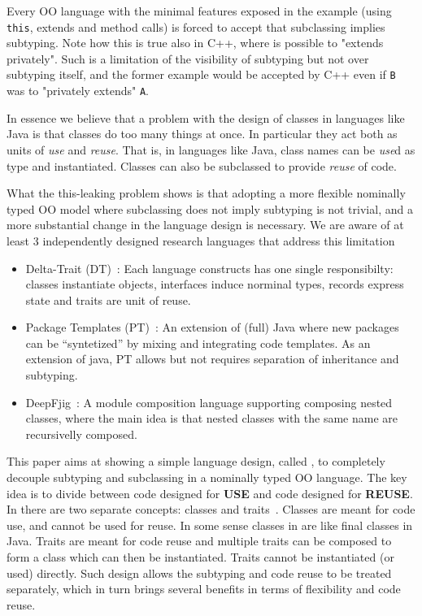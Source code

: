 Every OO language with the minimal features exposed in the example (using \lstinline{this},
extends and method calls) is forced to accept that subclassing implies
subtyping. Note how this is true also in C++, where is
  possible to "extends privately". Such is a limitation of the
  visibility of subtyping but not over subtyping itself, and the
  former example would be accepted by C++ even if \lstinline{B} was to
  "privately extends" \lstinline{A}.
  
In essence we believe that a problem with the design of classes in
languages like Java is that classes do too many things at once. In
particular they act both as units of \emph{use} and \emph{reuse}.
That is, in languages like Java, class names can be \emph{use}d as
type and instantiated.  Classes can also be subclassed to provide
\emph{reuse} of code.

What the this-leaking problem shows is that 
adopting a more flexible nominally typed OO model where subclassing
does not imply subtyping is not trivial, and a more substantial change
in the language design is necessary. 
We are aware of at least 3 independently designed research languages 
that address this limitation
\begin{itemize}
\item Delta-Trait (DT)~\cite{Bettini:2010:ISP:1774088.1774530,BETTINI2013521,Bettini2015282}:
Each language constructs  has one single responsibilty: classes instantiate objects,
interfaces induce norminal types, records express state and traits are unit of reuse.
\item Package Templates (PT)~\cite{KrogdahlMS09,DBLP:journals/taosd/AxelsenSKM12,DBLP:conf/gpce/AxelsenK12}:
An extension of (full) Java where new packages can be ``syntetized'' by mixing
and integrating code templates. As an extension of java, PT allows but not requires
separation of inheritance and subtyping.
\item DeepFjig~\cite{deep,servetto2014meta,DBLP:journals/iandc/LagorioSZ12}:
A module composition language supporting composing nested classes, where the main idea is that
nested classes with the same name are recursivelly composed.
\end{itemize}

This paper aims at showing a simple language design, called \name, to
completely decouple subtyping and subclassing in a nominally typed OO
language. The key idea is to divide between code designed for
\textbf{USE} and code designed for \textbf{REUSE}. 
In \name there are two separate concepts: classes
and traits~\cite{Traits:ECOOP2003}. Classes are meant for code use, and cannot be used
for reuse. In some sense classes in \name are like final classes in
Java. Traits are meant for code reuse and multiple traits can be
composed to form a class which can then be instantiated. Traits 
cannot be instantiated (or used) directly. Such design allows the
subtyping and code reuse to be treated separately, which in turn
brings several benefits in terms of flexibility and code reuse.


